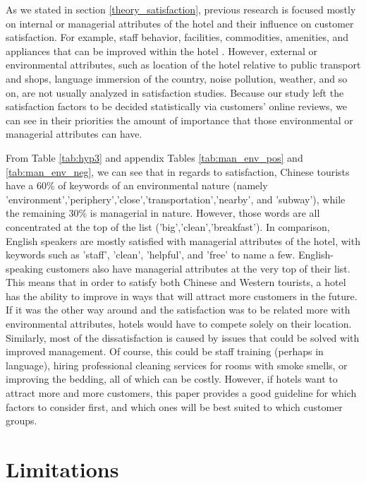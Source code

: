 \documentclass[review]{elsarticle}
\begin{document}
As we stated in section \ref{theory_satisfaction}, previous research is focused mostly on internal or managerial attributes of the hotel and their influence on customer satisfaction. For example, staff behavior, facilities, commodities, amenities, and appliances that can be improved within the hotel \cite[e.g.][]{shanka2004, choi2001}. However, external or environmental attributes, such as location of the hotel relative to public transport and shops, language immersion of the country, noise pollution, weather, and so on, are not usually analyzed in satisfaction studies. Because our study left the satisfaction factors to be decided statistically via customers' online reviews, we can see in their priorities the amount of importance that those environmental or managerial attributes can have. 

From Table \ref{tab:hyp3} and appendix Tables \ref{tab:man_env_pos} and \ref{tab:man_env_neg}, we can see that in regards to satisfaction, Chinese tourists have a 60\% of keywords of an environmental nature (namely 'environment','periphery','close','transportation','nearby', and 'subway'), while the remaining 30\% is managerial in nature. However, those words are all concentrated at the top of the list ('big','clean','breakfast'). In comparison, English speakers are mostly satisfied with managerial attributes of the hotel, with keywords such as 'staff', 'clean', 'helpful', and 'free' to name a few. English-speaking customers also have managerial attributes at the very top of their list. This means that in order to satisfy both Chinese and Western tourists, a hotel has the ability to improve in ways that will attract more customers in the future. If it was the other way around and the satisfaction was to be related more with environmental attributes, hotels would have to compete solely on their location. Similarly, most of the dissatisfaction is caused by issues that could be solved with improved management. Of course, this could be staff training (perhaps in language), hiring professional cleaning services for rooms with smoke smells, or improving the bedding, all of which can be costly. However, if hotels want to attract more and more customers, this paper provides a good guideline for which factors to consider first, and which ones will be best suited to which customer groups.

\section{Limitations}\label{limitations}
\end{document}
